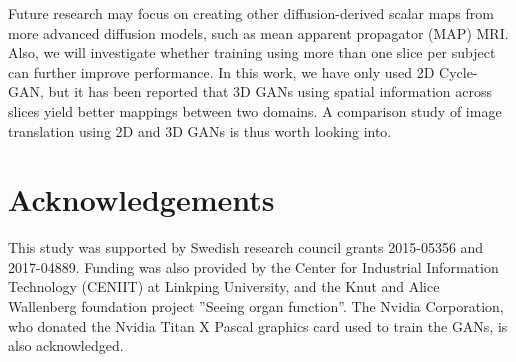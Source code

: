 \documentclass{article}
\begin{document}
Future research may focus on creating other diffusion-derived scalar maps from more advanced diffusion models, such as mean apparent propagator (MAP) MRI. Also, we will investigate whether training using more than one slice per subject can further improve performance. In this work, we have only used 2D Cycle-GAN, but it has been reported that 3D GANs using spatial information \cite{nie2017medical} across slices yield better mappings between two domains. A comparison study of image translation using 2D and 3D GANs is thus worth looking into.


\section*{Acknowledgements}

This study was supported by Swedish research council grants 2015-05356 and 2017-04889. Funding was also provided by the Center for Industrial Information Technology (CENIIT) at Linkping University, and the Knut and Alice Wallenberg foundation project ”Seeing organ function”. The Nvidia Corporation, who donated the Nvidia Titan X Pascal graphics card used to train the GANs, is also acknowledged.

\vfill
\pagebreak




\end{document}
